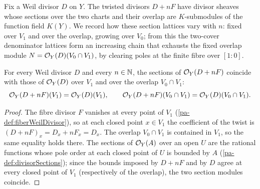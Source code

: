 Fix a Weil divisor \(D\) on \(Y\). The twisted divisors \(D + nF\) have divisor sheaves whose
sections over the two charts and their overlap are \(K\)-submodules of the function field \(K(Y)\).
We record how these section lattices vary with \(n\): fixed over \(V_1\) and over the overlap,
growing over \(V_0\); from this the two-cover denominator lattices form an increasing chain that
exhausts the fixed overlap module \(N = \mathcal{O}_{Y}(D)(V_0 \cap V_1)\), by clearing poles at the
finite fibre over \([1 : 0]\).

\begin{theorem}
  \label{pa-thm:divisorSections_twist_fixed}
  \leanok

  For every Weil divisor \(D\) and every \(n \in \mathbb{N}\), the sections of \(\mathcal{O}_{Y}(D + nF)\)
  coincide with those of \(\mathcal{O}_{Y}(D)\) over \(V_1\) and over the overlap \(V_0 \cap V_1\):
  \[
    \mathcal{O}_{Y}(D + nF)(V_1) = \mathcal{O}_{Y}(D)(V_1), \qquad
    \mathcal{O}_{Y}(D + nF)(V_0 \cap V_1) = \mathcal{O}_{Y}(D)(V_0 \cap V_1).
  \]
\end{theorem}
\begin{proof}
  \leanok
  The fibre divisor \(F\) vanishes at every point of \(V_1\) (\ref{pa-def:fiberWeilDivisor}), so at each
  closed point \(x \in V_1\) the coefficient of the twist is \((D + nF)_x = D_x + n F_x = D_x\). The
  overlap \(V_0 \cap V_1\) is contained in \(V_1\), so the same equality holds there. The sections of
  \(\mathcal{O}_{Y}(A)\) over an open \(U\) are the rational functions whose pole order at each closed point
  of \(U\) is bounded by \(A\) (\ref{pa-def:divisorSections}); since the bounds imposed by \(D + nF\) and
  by \(D\) agree at every closed point of \(V_1\) (respectively of the overlap), the two section
  modules coincide.
\end{proof}

